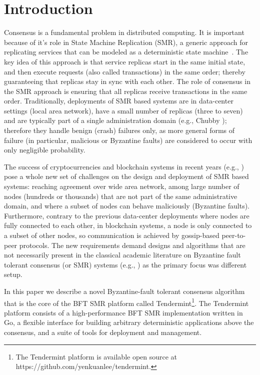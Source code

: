 \section{Introduction} \label{sec:tendermint}

Consensus is a fundamental problem in distributed computing. It
is important because of it's role in State Machine Replication (SMR), a generic
approach for replicating services that can be modeled as a deterministic state
machine~\cite{Lam78:cacm, Sch90:survey}. The key idea of this approach is that
service replicas start in the same initial state, and then execute requests
(also called transactions) in the same order; thereby guaranteeing that
replicas stay in sync with each other. The role of consensus in the SMR
approach is ensuring that all replicas receive transactions in the same order.
Traditionally, deployments of SMR based systems are in data-center settings
(local area network), have a small number of replicas (three to seven) and are
typically part of a single administration domain (e.g., Chubby
\cite{Bur:osdi06}); therefore they handle benign (crash) failures only, as more
general forms of failure (in particular, malicious or Byzantine faults) are
considered to occur with only negligible probability.  

The success of cryptocurrencies and blockchain systems in recent years (e.g.,
\cite{Nak2012:bitcoin, But2014:ethereum}) pose a whole new set of challenges on
the design and deployment of SMR based systems: reaching agreement over wide
area network, among large number of nodes (hundreds or thousands) that are not
part of the same administrative domain, and where a subset of nodes can behave
maliciously (Byzantine faults). Furthermore, contrary to the previous
data-center deployments where nodes are fully connected to each other, in
blockchain systems, a node is only connected to a subset of other nodes, so
communication is achieved by gossip-based peer-to-peer protocols. 
The new requirements demand designs and algorithms that are not necessarily
present in the classical academic literature on Byzantine fault tolerant
consensus (or SMR) systems (e.g., \cite{DLS88:jacm, CL02:tcs}) as the primary 
focus was different setup. 

In this paper we describe a novel Byzantine-fault tolerant consensus algorithm
that is the core of the BFT SMR platform called Tendermint\footnote{The
	Tendermint platform is available open source at
	https://github.com/yenkuanlee/tendermint.}. The Tendermint platform consists of
a high-performance BFT SMR implementation written in Go, a flexible interface
for
building arbitrary deterministic applications above the consensus, and a suite
of tools for deployment and management.  

